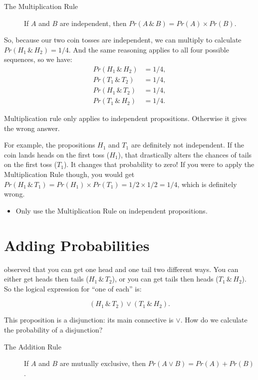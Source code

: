 \documentclass[justified]{tufte-book}
\newenvironment{warning}{\begin{itemize}\item[\faBan]}{\end{itemize}}
\theoremstyle{definition}
\theoremstyle{definition}
\theoremstyle{definition}
\theoremstyle{remark}
\begin{document}
\begin{description}
\item[The Multiplication Rule]
If \(A\) and \(B\) are independent, then \(Pr(A \,\&\, B) = Pr(A) \times Pr(B)\).
\end{description}

So, because our two coin tosses are independent, we can multiply to calculate \(Pr(H_1 \,\&\, H_2) = 1/4\). And the same reasoning applies to all four possible sequences, so we have:
\[
  \begin{aligned}
    Pr(H_1 \,\&\, H_2) &= 1/4,\\
    Pr(T_1 \,\&\, T_2) &= 1/4,\\
    Pr(H_1 \,\&\, T_2) &= 1/4,\\
    Pr(T_1 \,\&\, H_2) &= 1/4.
  \end{aligned}
\]

 Multiplication rule only applies to independent propositions. Otherwise it gives the wrong answer.

For example, the propositions \(H_1\) and \(T_1\) are definitely not independent. If the coin lands heads on the first toss (\(H_1\)), that drastically alters the chances of tails on the first toss (\(T_1\)). It changes that probability to zero! If you were to apply the Multiplication Rule though, you would get \(Pr(H_1 \,\&\, T_1) = Pr(H_1) \times Pr(T_1) = 1/2 \times 1/2 = 1/4\), which is definitely wrong.

\begin{warning}
Only use the Multiplication Rule on independent propositions.
\end{warning}

\hypertarget{adding-probabilities}{%
\section{Adding Probabilities}\label{adding-probabilities}}

 observed that you can get one head and one tail two different ways. You can either get heads then tails (\(H_1 \,\&\, T_2\)), or you can get tails then heads (\(T_1 \,\&\, H_2\)). So the logical expression for ``one of each'' is:

\[ (H_1 \,\&\, T_2) \vee (T_1 \,\&\, H_2). \]

This proposition is a disjunction: its main connective is \(\vee\). How do we calculate the probability of a disjunction?

\begin{description}
\item[The Addition Rule]
If \(A\) and \(B\) are mutually exclusive, then \(Pr(A \vee B) = Pr(A) + Pr(B)\).
\end{description}
\end{document}
